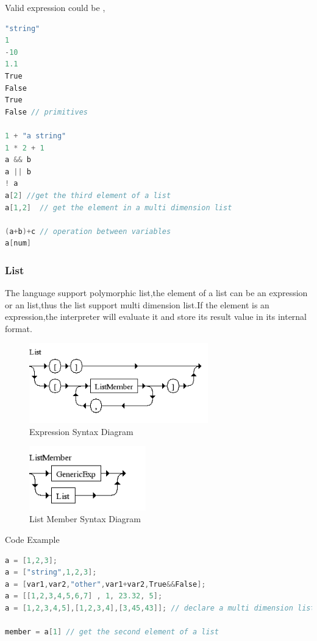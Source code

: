 Valid expression could be ,
\begin{lstlisting}[language=java]
"string"
1
-10 
1.1
True
False
True 
False // primitives 

1 + "a string"
1 * 2 + 1  
a && b
a || b
! a
a[2] //get the third element of a list
a[1,2]  // get the element in a multi dimension list

(a+b)+c // operation between variables
a[num] 
\end{lstlisting}


\subsubsection*{List}
The language support polymorphic list,the element of a list can be an expression or an list,thus the list support multi dimension list.If the element is an expression,the interpreter will evaluate it and store its result value in its internal format.

\begin{figure}[h!]
  \centering
	\includegraphics[width=0.69\textwidth]{pic/c4/list.png}
	\caption{Expression Syntax Diagram}
\end{figure}


\begin{figure}[H]
  \centering
	\includegraphics[width=0.45\textwidth]{pic/c4/list_member.png}
	\caption{List Member Syntax Diagram}
\end{figure}

Code Example

\begin{lstlisting}[language=java]
a = [1,2,3];
a = ["string",1,2,3];
a = [var1,var2,"other",var1+var2,True&&False]; 
a = [[1,2,3,4,5,6,7] , 1, 23.32, 5];
a = [1,2,3,4,5],[1,2,3,4],[3,45,43]]; // declare a multi dimension list

member = a[1] // get the second element of a list
\end{lstlisting}


